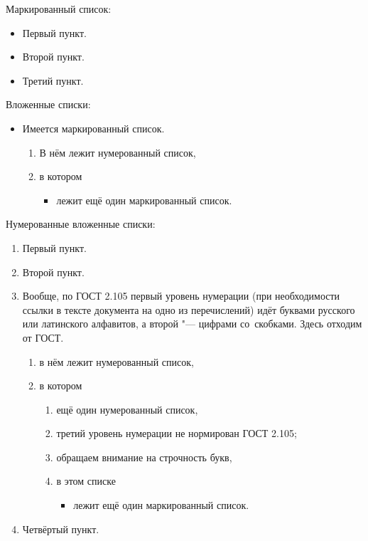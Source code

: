 \noindent Маркированный список:
\begin{itemize}
    \item Первый пункт.
    \item Второй пункт.
    \item Третий пункт.
\end{itemize}

\noindent Вложенные списки:
\begin{itemize}
    \item Имеется маркированный список.
          \begin{enumerate}
              \item В нём лежит нумерованный список,
              \item в котором
                    \begin{itemize}
                        \item лежит ещё один маркированный список.
                    \end{itemize}
          \end{enumerate}
\end{itemize}

\noindent Нумерованные вложенные списки:
\begin{enumerate}
    \item Первый пункт.
    \item Второй пункт.
    \item Вообще, по ГОСТ 2.105 первый уровень нумерации
          (при необходимости ссылки в тексте документа на одно из перечислений)
          идёт буквами русского или латинского алфавитов,
          а второй "--- цифрами со~скобками.
          Здесь отходим от ГОСТ.
          \begin{enumerate}
              \item в нём лежит нумерованный список,
              \item в котором
                    \begin{enumerate}
                        \item ещё один нумерованный список,
                        \item третий уровень нумерации не нормирован ГОСТ 2.105;
                        \item обращаем внимание на строчность букв,
                        \item в этом списке
                              \begin{itemize}
                                  \item лежит ещё один маркированный список.
                              \end{itemize}
                    \end{enumerate}

          \end{enumerate}

    \item Четвёртый пункт.
\end{enumerate}

